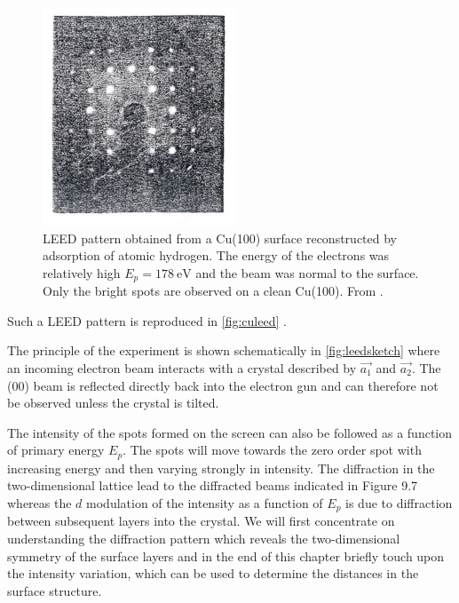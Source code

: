 \begin{figure}[h!]
	\begin{center}
	\includegraphics[scale=4]{figures/09_06.png}
	\caption{LEED pattern obtained from a Cu(100) surface reconstructed by adsorption of atomic hydrogen. The energy of the electrons was relatively high $E_p=\SI{178}{\electronvolt}$ and the beam was  normal to the surface. Only the bright spots are observed on a clean Cu(100). From \cite{HonCu}.}
	\label{fig:culeed}
	\end{center}
\end{figure}

Such a LEED pattern is reproduced in \autoref{fig:culeed} \cite{HonCu}.

The principle of the experiment is shown schematically in \autoref{fig:leedsketch} where an incoming electron beam interacts with a crystal described by $\vec{a_1}$ and $\vec{a_2}$. The (00) beam is reflected directly back into the electron gun and can therefore not be observed unless  the crystal is tilted.

The intensity of the spots formed on the screen can also be followed as a function of primary energy $E_p$. The spots will move towards the zero order spot with increasing energy and then varying strongly in intensity. The diffraction in the two-dimensional lattice lead to the diffracted beams indicated in Figure 9.7 whereas the $d$ modulation of the intensity as a function of $E_p$ is due to diffraction between subsequent layers into the crystal. We will first concentrate on understanding the diffraction pattern which reveals the two-dimensional symmetry of the surface layers and in the end of this chapter  briefly touch upon the intensity variation, which can be used to determine the distances in the surface structure.

